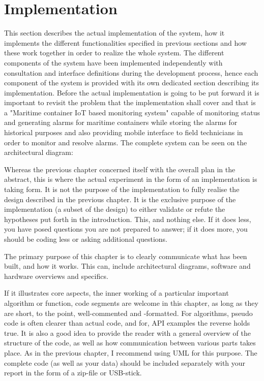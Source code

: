 \chapter{Implementation}
\label{cha:implementation}

This section describes the actual implementation of the system, how it implements the different functionalities specified in previous sections and how these work together in order to realize the whole system. The different components of the system have been implemented independently with consultation and interface definitions during the development process, hence each component of the system is provided with its own dedicated section describing its implementation. Before the actual implementation is going to be put forward it is important to revisit the problem that the implementation shall cover and that is a "Maritime container IoT based monitoring system" capable of monitoring status and generating alarms for maritime containers while storing the alarms for historical purposes and also providing mobile interface to field technicians in order to monitor and resolve alarms. The complete system can be seen on the architectural diagram:

Whereas the previous chapter concerned itself with the overall plan in the abstract, this is where the actual experiment in the form of an implementation is taking form.  It is not the purpose of the implementation to fully realise the design described in the previous chapter. It is the exclusive purpose of the implementation (a subset of the design) to either validate or refute the hypotheses put forth
in the introduction. This, and nothing else. If it does less, you have posed questions you are not prepared to answer; if it does more, you should be coding less or asking additional questions.

The primary purpose of this chapter is to clearly communicate what has
been built, and how it works. This can, \eg include architectural
diagrams, software and hardware overviews and specifics.

If it illustrates core aspects, \eg the inner working of a particular
important algorithm or function, code segments are welcome in this
chapter, as long as they are short, to the point, well-commented and
-formatted.  For algorithms, pseudo code is often clearer than actual
code, and for, \eg \acs{API} examples the reverse holds true.  It is
also a good idea to provide the reader with a general overview of the
structure of the code, as well as how communication between various
parts takes place.  As in the previous chapter, I recommend using
\ac{UML} for this purpose.  The complete code (as well as your data)
should be included separately with your report in the form of a
zip-file or USB-stick.

